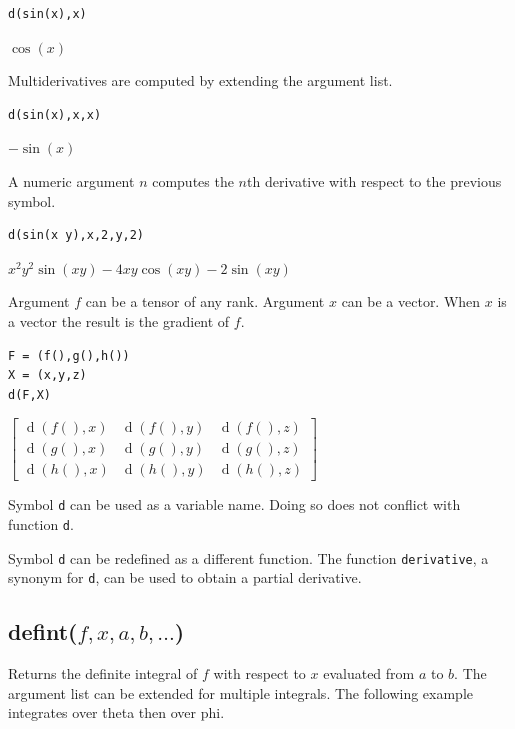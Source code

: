 \documentclass[12pt]{article}
\begin{document}
{\color{blue}
\begin{verbatim}
d(sin(x),x)
\end{verbatim}
}

\noindent
$\cos(x)$

\bigskip
\noindent
Multiderivatives are computed by extending the argument list.

{\color{blue}
\begin{verbatim}
d(sin(x),x,x)
\end{verbatim}
}

\noindent
$-\sin(x)$

\bigskip
\noindent
A numeric argument $n$ computes the $n$th derivative with respect to the previous symbol.

{\color{blue}
\begin{verbatim}
d(sin(x y),x,2,y,2)
\end{verbatim}
}

\noindent
$x^2y^2\sin(xy)-4xy\cos(xy)-2\sin(xy)$

\bigskip
\noindent
Argument $f$ can be a tensor of any rank.
Argument $x$ can be a vector.
When $x$ is a vector the result is the gradient of $f$.

{\color{blue}
\begin{verbatim}
F = (f(),g(),h())
X = (x,y,z)
d(F,X)
\end{verbatim}
}

\noindent
$\displaystyle
\begin{bmatrix}
\operatorname{d}(f(),x) & \operatorname{d}(f(),y) &  \operatorname{d}(f(),z)
\\[1ex]
\operatorname{d}(g(),x) & \operatorname{d}(g(),y) &  \operatorname{d}(g(),z)
\\[1ex]
\operatorname{d}(h(),x) & \operatorname{d}(h(),y) &  \operatorname{d}(h(),z)
\end{bmatrix}
$

\bigskip
\noindent
Symbol \verb$d$ can be used as a variable name.
Doing so does not conflict with function \verb$d$.

\bigskip
\noindent
Symbol \verb$d$ can be redefined as a different function.
The function \verb$derivative$, a synonym for \verb$d$, can be used to obtain a partial derivative.

\subsection*{defint($f,x,a,b,\ldots$)}

Returns the definite integral of $f$ with respect to $x$
evaluated from $a$ to $b$.
The argument list can be extended for multiple integrals.
The following example integrates over theta then over phi.
\end{document}
